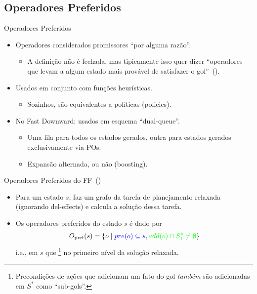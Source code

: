\documentclass{beamer}
\begin{document}
\subsection{Operadores Preferidos}
\begin{frame}{Operadores Preferidos}
\begin{itemize}
\item \alert{Operadores} considerados \alert{promissores} ``por alguma razão''.
    \pause
  \begin{itemize}
  \item A definição não é fechada, mas tipicamente isso quer dizer ``operadores que levam a algum estado mais provável de satisfazer o gol''~(\cite{Helmert/2006,Richter.Helmert/2009}).
  \end{itemize}
  \pause
\item Usados em conjunto com funções heurísticas.
  \begin{itemize}
  \item Sozinhos, são equivalentes a políticas (policies).
  \end{itemize}
\pause
\item No Fast Downward: usados em esquema ``\alert{dual-queue}''.
  \begin{itemize}
  \item Uma fila para todos os estados gerados, outra para \alert{estados gerados exclusivamente via POs}.
  \item Expansão alternada, ou não (\alert{boosting}).
  \end{itemize}
\end{itemize}
\end{frame}

\begin{frame}{Operadores Preferidos do FF~(\cite{Hoffmann.Nebel/2001})}
\begin{itemize}
\item Para um estado $s$, faz um grafo da tarefa de planejamento \alert{relaxada} (ignorando del-effects) e calcula a solução dessa tarefa.
\pause
\item Os operadores preferidos do estado $s$ é dado por $$O_{\text{pref}}(s) = \{o \mid {\color{blue} pre(o) \subseteq s}, {\color{green} add(o) \cap S_{1}^{*} \neq \emptyset} \}$$
i.e.,  em $s$ que \footnote{Precondições de ações que adicionam um fato do gol \emph{também} são adicionadas em $S^{*}$ como ``sub-gols''.} no primeiro nível da solução relaxada.
\end{itemize}
\end{frame}
\end{document}
